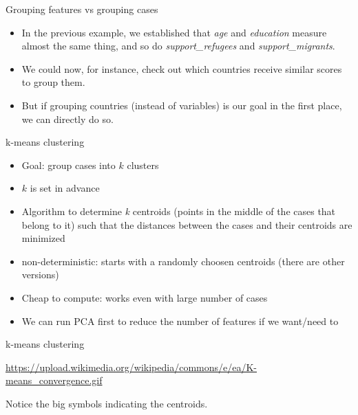 \begin{frame}{Grouping features vs grouping cases}
  \begin{itemize}[<+->]
  \item  In the previous example, we established that \emph{age} and \emph{education} measure almost the same thing, and so do \emph{support\_refugees} and \emph{support\_migrants}.
  \item We could now, for instance, check out which countries receive similar scores to group them.
  \item But if grouping countries (instead of variables) is our goal in the first place, we can directly do so.
  \end{itemize}
\end{frame}




\begin{frame}{k-means clustering}
\begin{itemize}[<+->]
\item Goal: group cases into $k$ clusters
\item $k$ is set in advance
\item Algorithm to determine \textit{k} centroids (points in the middle of the cases that belong to it) such that the distances between the cases and their centroids are minimized
\item non-deterministic: starts with a randomly choosen centroids (there are other versions)
\item Cheap to compute: works even with large number of cases
\item We can run PCA first to reduce the number of features if we want/need to
\end{itemize}
\end{frame}




\begin{frame}{k-means clustering}

{\tiny{\url{https://upload.wikimedia.org/wikipedia/commons/e/ea/K-means\_convergence.gif}}}

Notice the big symbols indicating the centroids.
\end{frame}


